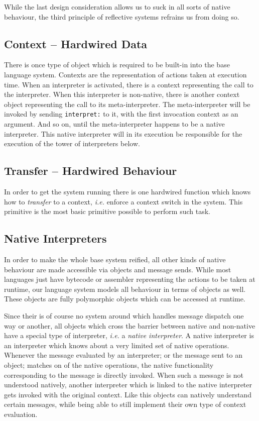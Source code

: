 \documentclass{article}
\newcommand{\ie}{\emph{i.e.}\xspace}
\begin{document}
While the last design consideration allows us to suck in all sorts of
native behaviour, the third principle of reflective systems refrains us
from doing so. 

\subsection{Context -- Hardwired Data}
There is once type of object which is required to be built-in into the base
language system. Contexts are the representation of actions taken at
execution time. When an interpreter is activated, there is a context
representing the call to the interpreter. When this interpreter is non-native,
there is another context object representing the call to its meta-interpreter.
The meta-interpreter will be invoked by sending \verb$interpret:$ to it, with
the first invocation context as an argument. And so on, until the
meta-interpreter happens to be a native interpreter. This native interpreter
will in its execution be responsible for the execution of the tower of
interpreters below.

\subsection{Transfer -- Hardwired Behaviour}
In order to get the system running there is one hardwired
function which knows how to \emph{transfer} to a context, \ie enforce
a context switch in the system. This primitive is the most
basic primitive possible to perform such task.

\subsection{Native Interpreters}
In order to make the whole base system reified, all other kinds of native
behaviour are made accessible via objects and message sends. While most
languages just have bytecode or assembler representing the actions to be taken
at runtime, our language system models all behaviour in terms of objects as
well. These objects are fully polymorphic objects which can be accessed at
runtime.

Since their is of course no system around which handles message
dispatch one way or another, all objects which cross the barrier between
native and non-native have a special type of interpreter, \ie a
\emph{native interpreter}. A native interpreter is an interpreter which knows
about a very limited set of native operations. Whenever the message evaluated
by an interpreter; or the message sent to an object; matches on of the native
operations, the native functionality corresponding to the message is directly
invoked. When such a message is not understood natively, another interpreter
which is linked to the native interpreter gets invoked with the original
context. Like this objects can natively understand certain messages, while
being able to still implement their own type of context evaluation.
\end{document}
